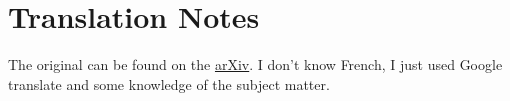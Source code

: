 \chapter*{Translation Notes}

The original can be found on the \href{https://arxiv.org/abs/math/0206203}{arXiv}. I don't know French, I just used Google translate and some knowledge of the subject matter.

